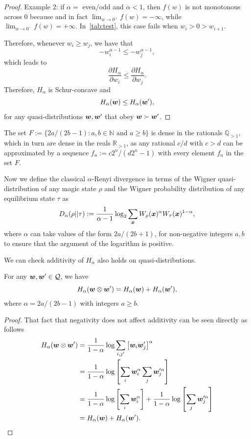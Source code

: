 \documentclass[pra,
aps,
twocolumn,
superscriptaddress,
groupedaddress,
nofootinbib,
reprint
]{revtex4-1}
\begin{document}
\begin{proof}
{Example 2: if $\alpha =$ even$/$odd and $\alpha < 1$, then  $f(w)$ is not monotonous across $0$ because and in fact $\lim_{w\rightarrow 0^+} f(w) = -\infty$, while $\lim_{w\rightarrow 0^-} f(w) = +\infty$. 
In~\cref{tab:test}, this case fails when $w_i > 0 > w_{i+1}$.
}

Therefore, whenever $w_i \geq w_j$, we have that 
\begin{equation}
	-w_i^{\alpha-1} \leq -w_j^{\alpha-1},
\end{equation}
which leads to
\begin{equation}
	\frac{\partial H_\alpha}{\partial w_i} \leq \frac{\partial H_\alpha}{\partial w_j}.
\end{equation}
Therefore, $H_\alpha$ is Schur-concave and
\begin{equation}
	H_\alpha(\boldsymbol{w}) \leq H_\alpha(\boldsymbol{w}'),
\end{equation}
for any quasi-distributions $\boldsymbol{w}, \boldsymbol{w}'$ that obey $\boldsymbol{w} \succ \boldsymbol{w}'$.
\end{proof}
The set $F := \{2a/(2b-1): a,b \in \mathbb{N} \text{ and } a \geq b\}$ is dense in the rationals $\mathbb{Q}_{>1}$, which in turn are dense in the reals $\mathbb{R}_{>1}$, as any rational $c/d$ with $c>d$ can be approximated by a sequence $f_n := c2^n / (d2^n-1)$ with every element $f_n$ in the set $F$. 

Now we define the classical $\alpha$-Renyi divergence in terms of the Wigner quasi-distribution of any magic state $\rho$ and the Wigner probability distribution of any equilibrium state $\tau$ as
\begin{equation}
	D_\alpha(\rho || \tau) := \frac{1}{\alpha - 1} \log_2 \sum_{\bm{x}} W_{\rho}(\bm{x})^\alpha W_{\tau}(\bm{x})^{1-\alpha},
\end{equation}
where $\alpha$ can take values of the form $2a / (2b+1)$, for non-negative integers $a,b$ to ensure that the argument of the logarithm is positive.

We can check additivity of $H_{\alpha}$ also holds on quasi-distributions. 
\begin{lemma}\label{H_add}
	For any $\boldsymbol{w}, \boldsymbol{w}' \in \mathcal{Q}$, we have
	\begin{equation}
		H_{\alpha}(\boldsymbol{w}\otimes \boldsymbol{w}') = H_{\alpha}(\boldsymbol{w}) + H_{\alpha}(\boldsymbol{w}'),
	\end{equation}
	where $\alpha = 2a/(2b-1)$ with integers $a\ge b$.
\end{lemma}
\begin{proof}
	That fact that negativity does not affect additivity can be seen directly as follows
	\begin{align*}
		H_{\alpha}(\boldsymbol{w} \otimes \boldsymbol{w}') &= \frac{1}{1-\alpha}\log \sum_{i,j'} \left[\boldsymbol{w}_i \boldsymbol{w}'_j\right]^{\alpha} \\
		&= \frac{1}{1-\alpha}\log  \left [ \sum_i\boldsymbol{w}_i^\alpha \sum_j\boldsymbol{w}_j^{\prime \alpha} \right ] \\
				&= \frac{1}{1-\alpha}\log  \left [ \sum_i\boldsymbol{w}_i^\alpha\right ] + \frac{1}{1-\alpha}\log \left [ \sum_j\boldsymbol{w}_j^{\prime \alpha} \right ] \\
		&= H_{\alpha}(\boldsymbol{w}) + H_{\alpha}(\boldsymbol{w}').
	\end{align*}
\end{proof}
\end{document}
